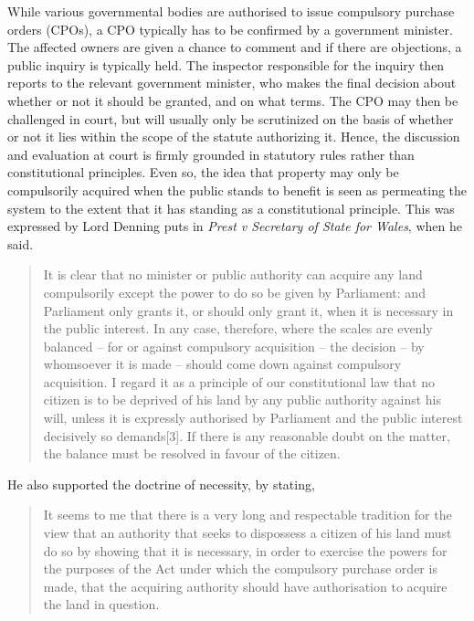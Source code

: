 While various governmental bodies are authorised to issue compulsory purchase orders (CPOs), a CPO typically has to be confirmed by a government minister. The affected owners are given a chance to comment and if there are objections, a public inquiry is typically held. The inspector responsible for the inquiry then reports to the relevant government minister, who makes the final decision about whether or not it should be granted, and on what terms. The CPO may then be challenged in court, but will usually only be scrutinized on the basis of whether or not it lies within the scope of the statute authorizing it. Hence, the discussion and evaluation at court is firmly grounded in statutory rules rather than constitutional principles. Even so, the idea that property may only be compulsorily acquired when the public stands to benefit is seen as permeating the system to the extent that it has standing as a constitutional principle. This was expressed by Lord Denning puts in {\it Prest v Secretary of State for Wales}, when he said.

\begin{quote}
It is clear that no minister or public authority can acquire any land compulsorily except the power to do so be given by Parliament: and Parliament only grants it, or should only grant it, when it is necessary in the public interest. In any case, therefore, where the scales are evenly balanced – for or against compulsory acquisition – the decision – by whomsoever it is made – should come down against compulsory acquisition. I regard it as a principle of our constitutional law that no citizen is to be deprived of his land by any public authority against his will, unless it is expressly authorised by Parliament and the public interest decisively so demands[3]. If there is any reasonable doubt on the matter, the balance must be resolved in favour of the citizen.
\end{quote}

He also supported the doctrine of necessity, by stating,

\begin{quote}It seems to me that there is a very long and respectable tradition for the view that an authority that seeks to dispossess a citizen of his land must do so by showing that it is necessary, in order to exercise the powers for the purposes of the Act under which the compulsory purchase order is made, that the acquiring authority should have authorisation to acquire the land in question.\end{quote}

